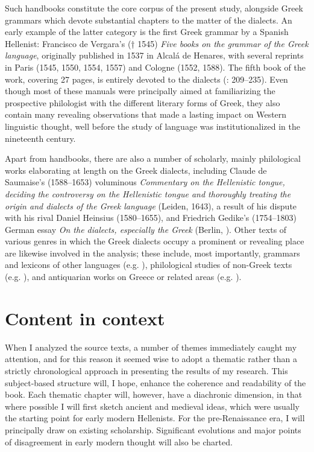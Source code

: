 Such handbooks constitute the core corpus of the present study, alongside Greek grammars which devote substantial chapters to the matter of the dialects. An early example of the latter category is the first Greek grammar by a Spanish Hellenist: Francisco de Vergara’s († 1545) \textit{Five books on the grammar of the Greek language}, originally published in 1537 in Alcalá de Henares, with several reprints in Paris (1545, 1550, 1554, 1557) and Cologne (1552, 1588). The fifth book of the work, covering 27 pages, is entirely devoted to the dialects (\citealt{Vergara1537}: 209–235). Even though most of these manuals were principally aimed at familiarizing the prospective philologist with the different literary forms of Greek, they also contain many revealing observations that made a lasting impact on Western linguistic thought, well before the study of language was institutionalized in the nineteenth century.

Apart from handbooks, there are also a number of scholarly, mainly philological works elaborating at length on the Greek dialects, including Claude de Saumaise’s (1588–1653) voluminous \textit{Commentary on the Hellenistic tongue, deciding the controversy on the Hellenistic tongue and thoroughly treating the origin and dialects of the Greek language} (Leiden, 1643), a result of his dispute with his rival Daniel Heinsius (1580–1655), and Friedrich Gedike’s (1754–1803) German essay \textit{On the dialects, especially the Greek} (Berlin, \citeyear{Gedike1782}). Other texts of various genres in which the Greek dialects occupy a prominent or revealing place are likewise involved in the analysis; these include, most importantly, grammars and lexicons of other languages (e.g. \citealt{Gill1619}), philological studies of non-Greek texts (e.g. \citealt{Schultens1748}), and antiquarian works on Greece or related areas (e.g. \citealt{Castelli1769}).

\section{Content in context}\label{sec:1.3}

When I analyzed the source texts, a number of themes immediately caught my attention, and for this reason it seemed wise to adopt a thematic rather than a strictly chronological approach in presenting the results of my research. This subject-based structure will, I hope, enhance the coherence and readability of the book. Each thematic chapter will, however, have a diachronic dimension, in that where possible I will first sketch ancient and medieval ideas, which were usually the starting point for early modern Hellenists. For the pre-Renaissance era, I will principally draw on existing scholarship. Significant evolutions and major points of disagreement in early modern thought will also be charted.

